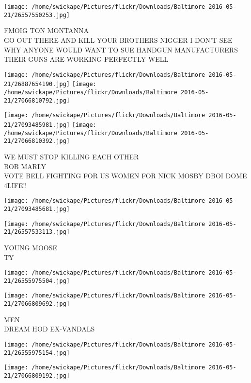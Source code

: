 \documentclass[10pt,letterpaper]{article}
\begin{document}
\vspace{0.25in}
\texttt{[image: /home/swickape/Pictures/flickr/Downloads/Baltimore 2016-05-21/26557550253.jpg]}

FMOIG TON MONTANNA\\
GO OUT THERE AND KILL YOUR BROTHERS NIGGER I DON'T SEE WHY ANYONE WOULD WANT TO SUE HANDGUN MANUFACTURERS THEIR GUNS ARE WORKING PERFECTLY WELL
\pagebreak

\texttt{[image: /home/swickape/Pictures/flickr/Downloads/Baltimore 2016-05-21/26887654190.jpg]}
\texttt{[image: /home/swickape/Pictures/flickr/Downloads/Baltimore 2016-05-21/27066810792.jpg]}

\texttt{[image: /home/swickape/Pictures/flickr/Downloads/Baltimore 2016-05-21/27093485981.jpg]}
\texttt{[image: /home/swickape/Pictures/flickr/Downloads/Baltimore 2016-05-21/27066810392.jpg]}

WE MUST STOP KILLING EACH OTHER\\
BOB MARLY\\
VOTE BELL FIGHTING FOR US WOMEN FOR NICK MOSBY DBOI DOME\\
4LIFE!!
\pagebreak

\texttt{[image: /home/swickape/Pictures/flickr/Downloads/Baltimore 2016-05-21/27093485681.jpg]}

\vspace{0.25in}
\texttt{[image: /home/swickape/Pictures/flickr/Downloads/Baltimore 2016-05-21/26557533113.jpg]}

YOUNG MOOSE\\
TY
\pagebreak

\texttt{[image: /home/swickape/Pictures/flickr/Downloads/Baltimore 2016-05-21/26555975504.jpg]}

\vspace{0.25in}
\texttt{[image: /home/swickape/Pictures/flickr/Downloads/Baltimore 2016-05-21/27066809692.jpg]}

MEN\\
DREAM HOD EX{-}VANDALS
\pagebreak

\texttt{[image: /home/swickape/Pictures/flickr/Downloads/Baltimore 2016-05-21/26555975154.jpg]}

\vspace{0.25in}
\texttt{[image: /home/swickape/Pictures/flickr/Downloads/Baltimore 2016-05-21/27066809192.jpg]}
\end{document}
